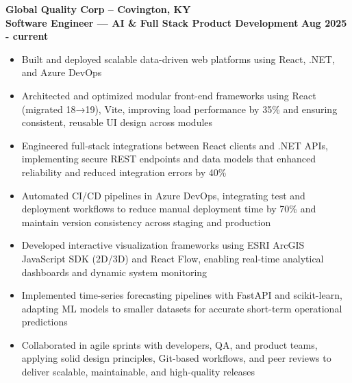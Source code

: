 \documentclass[a4paper,10pt]{article}
\begin{document}
\textbf{Global Quality Corp – Covington, KY} \\[3.75pt]
\textbf{Software Engineer — AI \& Full Stack Product Development} \hfill \textbf{Aug 2025 - current} \\[3.75pt]
\begin{minipage}[t]{\linewidth}
\begin{itemize}[nosep,after=\strut, leftmargin=1em, itemsep=3pt,label=$\bullet$]
\item Built and deployed scalable data-driven web platforms using React, .NET, and Azure DevOps
\item Architected and optimized modular front-end frameworks using React (migrated 18→19), Vite, improving load performance by 35\% and ensuring consistent, reusable UI design across modules
\item Engineered full-stack integrations between React clients and .NET APIs, implementing secure REST endpoints and data models that enhanced reliability and reduced integration errors by 40\%
\item Automated CI/CD pipelines in Azure DevOps, integrating test and deployment workflows to reduce manual deployment time by 70\% and maintain version consistency across staging and production
\item Developed interactive visualization frameworks using ESRI ArcGIS JavaScript SDK (2D/3D) and React Flow, enabling real-time analytical dashboards and dynamic system monitoring
\item Implemented time-series forecasting pipelines with FastAPI and scikit-learn, adapting ML models to smaller datasets for accurate short-term operational predictions
\item Collaborated in agile sprints with developers, QA, and product teams, applying solid design principles, Git-based workflows, and peer reviews to deliver scalable, maintainable, and high-quality releases
\end{itemize}
\end{minipage}
\end{document}
